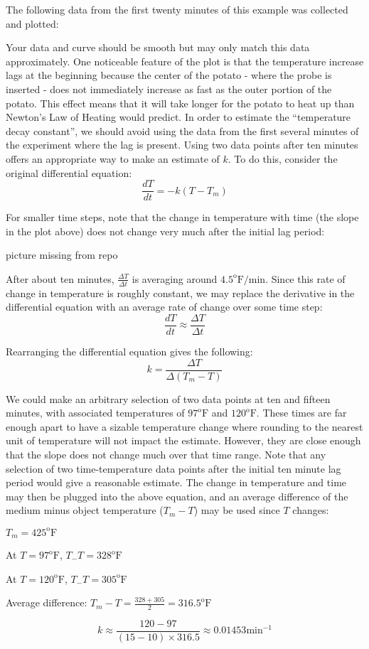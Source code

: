 \documentclass{ximera}
\begin{document}
The following data from the first twenty minutes of this example was collected and plotted:
 
\begin{center} 
\end{center}
 
Your data and curve should be smooth but may only match this data approximately.  One noticeable feature of the plot is that the temperature increase lags at the beginning because the center of the potato - where the probe is inserted - does not immediately increase as fast as the outer portion of the potato.  This effect means that it will take longer for the potato to heat up than Newton's Law of Heating would predict.  In order to estimate the ``temperature decay constant'', we should avoid using the data from the first several minutes of the experiment where the lag is present.  Using two data points after ten minutes offers an appropriate way to make an estimate of $k$.  To do this, consider the original differential equation:
\[
\frac{dT}{dt}=-k(T-T_m)
\]
 
For smaller time steps, note that the change in temperature with time (the slope in the plot above) does not change very much after the initial lag period:
 
\begin{image}
picture missing from repo
\end{image}
 
After about ten minutes, $\frac{\Delta T}{\Delta t}$ is averaging around $4.5^{\text{o}}\text{F}/\text{min}$. Since this rate of change in temperature is roughly constant, we may replace the derivative in the differential equation with an average rate of change over some time step:
\[
\frac{dT}{dt}\approx \frac{\Delta T}{\Delta t}
\]
 
Rearranging the differential equation gives the following:
\[
k=\frac{\Delta T}{\Delta(T_m-T)}
\]
 
We could make an arbitrary selection of two data points at ten and fifteen minutes, with associated temperatures of $97^{\text{o}}\text{F}$ and $120^{\text{o}}\text{F}$.  These times are far enough apart to have a sizable temperature change where rounding to the nearest unit of temperature will not impact the estimate.  However, they are close enough that the slope does not change much over that time range.  Note that any selection of two time-temperature data points after the initial ten minute lag period would give a reasonable estimate.  The change in temperature and time may then be plugged into the above equation, and an average difference of the medium minus object temperature ($T_m-T$) may be used since $T$ changes:
\begin{center}
$T_m=425^{\text{o}}\text{F}$
 
At $T=97^{\text{o}}\text{F}$, $T_-T=328^{\text{o}}\text{F}$
 
At $T=120^{\text{o}}\text{F}$, $T_-T=305^{\text{o}}\text{F}$
 
Average difference: $T_m-T=\frac{328+305}{2}=316.5^{\text{o}}\text{F}$
\end{center}
\[
k\approx\frac{120-97}{(15-10)\times316.5}\approx 0.01453\text{min}^{-1}
\]
 
\end{document}
